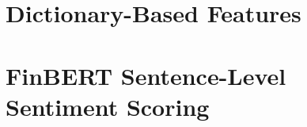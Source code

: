 \documentclass[12pt,a4paper,oneside]{report}
\begin{document}
\section{Dictionary-Based Features}
\label{sec:dictionary_features}

\section{FinBERT Sentence-Level Sentiment Scoring}
\label{sec:finbert_scoring}
\end{document}
